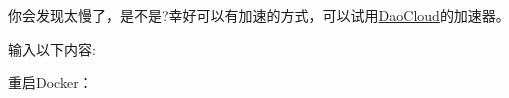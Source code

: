 \documentclass[12pt]{article}
\begin{document}
\begin{Shaded}
\begin{Highlighting}[]
\end{Highlighting}
\end{Shaded}

你会发现太慢了，是不是?幸好可以有加速的方式，可以试用\href{https://www.daocloud.io/mirror\#accelerator-doc}{DaoCloud}的加速器。

\begin{Shaded}
\begin{Highlighting}[]
\end{Highlighting}
\end{Shaded}

输入以下内容:

\begin{Shaded}
\begin{Highlighting}[]
\FunctionTok{\{}
    \FunctionTok{:} \OtherTok{[}
    \OtherTok{]}\FunctionTok{,}
    \FunctionTok{:} \OtherTok{[]}
\FunctionTok{\}}
\end{Highlighting}
\end{Shaded}

重启Docker：

\begin{Shaded}
\begin{Highlighting}[]
\end{Highlighting}
\end{Shaded}
\end{document}
